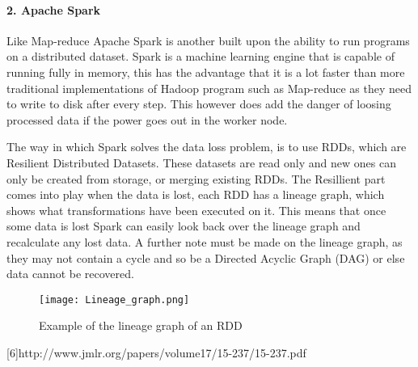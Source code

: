 \paragraph{2. Apache Spark}
Like Map-reduce Apache Spark is another built upon the ability to run programs
on a distributed dataset. Spark is a machine learning engine that is capable of
running fully in memory\cite{Sparkwebsite}, this has the advantage that it is a lot faster than
more traditional implementations of Hadoop program such as Map-reduce as they need
to write to disk after every step. This however does add the danger of loosing processed data
 if the power goes out in the worker node.

The way in which Spark solves the data loss problem, is to use RDDs, which are
Resilient Distributed Datasets. These datasets are read only and new ones can
only be created from storage, or merging existing RDDs\cite{Zaha12}. The Resillient part comes
into play when the data is lost, each RDD has a lineage graph, which shows what
transformations have been executed on it. This means that once some data is lost
Spark can easily look back over the lineage graph and recalculate any lost data.
A further note must be made on the lineage graph, as they may not contain a cycle
and so be a Directed Acyclic Graph (DAG) or else data cannot be recovered.

\begin{figure}
  \texttt{[image: Lineage\_graph.png]}
  \caption{Example of the lineage graph of an RDD\cite{Zaha12}}
  \label{lineagegraph}
\end{figure}




[6]http://www.jmlr.org/papers/volume17/15-237/15-237.pdf %
